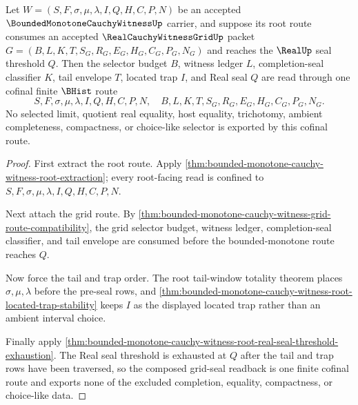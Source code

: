 \begin{theorem}
\label{thm:bounded-monotone-cauchy-witness-grid-seal-cofinal-route}
Let $W=(S,F,\sigma,\mu,\lambda,I,Q,H,C,P,N)$ be an accepted $\BoundedMonotoneCauchyWitnessUp$ carrier, and suppose its root route consumes an accepted $\RealCauchyWitnessGridUp$ packet $G=(B,L,K,T,S_G,R_G,E_G,H_G,C_G,P_G,N_G)$ and reaches the $\RealUp$ seal threshold $Q$. Then the selector budget $B$, witness ledger $L$, completion-seal classifier $K$, tail envelope $T$, located trap $I$, and Real seal $Q$ are read through one cofinal finite $\BHist$ route
$$
S,F,\sigma,\mu,\lambda,I,Q,H,C,P,N,\quad B,L,K,T,S_G,R_G,E_G,H_G,C_G,P_G,N_G.
$$
No selected limit, quotient real equality, host equality, trichotomy, ambient completeness, compactness, or choice-like selector is exported by this cofinal route.
\end{theorem}
\begin{proof}
First extract the root route. Apply \autoref{thm:bounded-monotone-cauchy-witness-root-extraction}; every root-facing read is confined to $S,F,\sigma,\mu,\lambda,I,Q,H,C,P,N$.

Next attach the grid route. By \autoref{thm:bounded-monotone-cauchy-witness-grid-route-compatibility}, the grid selector budget, witness ledger, completion-seal classifier, and tail envelope are consumed before the bounded-monotone route reaches $Q$.

Now force the tail and trap order. The root tail-window totality theorem places $\sigma,\mu,\lambda$ before the pre-seal rows, and \autoref{thm:bounded-monotone-cauchy-witness-root-located-trap-stability} keeps $I$ as the displayed located trap rather than an ambient interval choice.

Finally apply \autoref{thm:bounded-monotone-cauchy-witness-root-real-seal-threshold-exhaustion}. The Real seal threshold is exhausted at $Q$ after the tail and trap rows have been traversed, so the composed grid-seal readback is one finite cofinal route and exports none of the excluded completion, equality, compactness, or choice-like data.
\end{proof}

